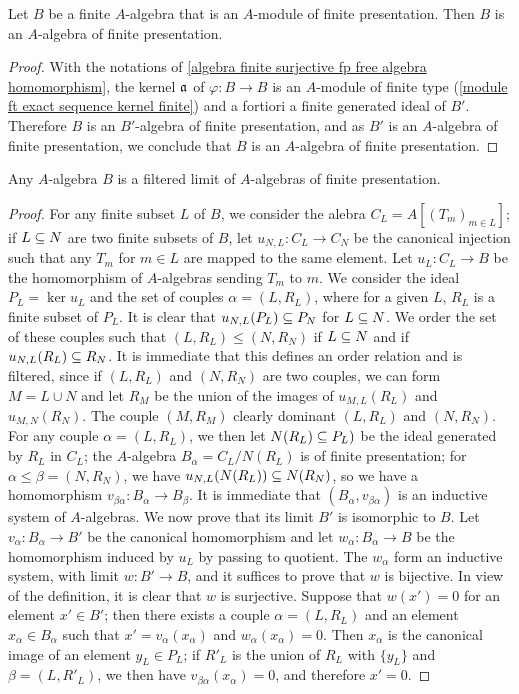 \begin{corollary}\label{algebra finite fp as module then fp as ring}
Let $B$ be a finite $A$-algebra that is an $A$-module of finite presentation. Then $B$ is an $A$-algebra of finite presentation.
\end{corollary}
\begin{proof}
With the notations of \cref{algebra finite surjective fp free algebra homomorphism}, the kernel $\mathfrak{a}$ of $\varphi:B\to B$ is an $A$-module of finite type (\cref{module ft exact sequence kernel finite}) and a fortiori a finite generated ideal of $B'$. Therefore $B$ is an $B'$-algebra of finite presentation, and as $B'$ is an $A$-algebra of finite presentation, we conclude that $B$ is an $A$-algebra of finite presentation.  
\end{proof}
\begin{proposition}\label{algebra is limit of fp algebra}
Any $A$-algebra $B$ is a filtered limit of $A$-algebras of finite presentation.
\end{proposition}
\begin{proof}
For any finite subset $L$ of $B$, we consider the alebra $C_L=A[(T_m)_{m\in L}]$; if $L\subseteq N$ are two finite subsets of $B$, let $u_{N,L}:C_L\to C_N$ be the canonical injection such that any $T_m$ for $m\in L$ are mapped to the same element. Let $u_L:C_L\to B$ be the homomorphism of $A$-algebras sending $T_m$ to $m$. We consider the ideal $P_L=\ker u_L$ and the set of couples $\alpha=(L,R_L)$, where for a given $L$, $R_L$ is a finite subset of $P_L$. It is clear that $u_{N,L}(P_L)\subseteq P_N$ for $L\subseteq N$. We order the set of these couples such that $(L,R_L)\leq(N,R_N)$ if $L\subseteq N$ and if $u_{N,L}(R_L)\subseteq R_N$. It is immediate that this defines an order relation and is filtered, since if $(L,R_L)$ and $(N,R_N)$ are two couples, we can form $M=L\cup N$ and let $R_M$ be the union of the images of $u_{M,L}(R_L)$ and $u_{M,N}(R_N)$. The couple $(M,R_M)$ clearly dominant $(L,R_L)$ and $(N,R_N)$. For any couple $\alpha=(L,R_L)$, we then let $N(R_L)\subseteq P_L)$ be the ideal generated by $R_L$ in $C_L$; the $A$-algebra $B_\alpha=C_L/N(R_L)$ is of finite presentation; for $\alpha\leq\beta=(N,R_N)$, we have $u_{N,L}(N(R_L))\subseteq N(R_N)$, so we have a homomorphism $v_{\beta\alpha}:B_\alpha\to B_\beta$. It is immediate that $(B_\alpha,v_{\beta\alpha})$ is an inductive system of $A$-algebras. We now prove that its limit $B'$ is isomorphic to $B$. Let $v_\alpha:B_\alpha\to B'$ be the canonical homomorphism and let $w_\alpha:B_\alpha\to B$ be the homomorphism induced by $u_L$ by passing to quotient. The $w_\alpha$ form an inductive system, with limit $w:B'\to B$, and it suffices to prove that $w$ is bijective. In view of the definition, it is clear that $w$ is surjective. Suppose that $w(x')=0$ for an element $x'\in B'$; then there exists a couple $\alpha=(L,R_L)$ and an element $x_\alpha\in B_\alpha$ such that $x'=v_\alpha(x_\alpha)$ and $w_\alpha(x_\alpha)=0$. Then $x_\alpha$ is the canonical image of an element $y_L\in P_L$; if $R'_L$ is the union of $R_L$ with $\{y_L\}$ and $\beta=(L,R'_L)$, we then have $v_{\beta\alpha}(x_\alpha)=0$, and therefore $x'=0$.
\end{proof}
